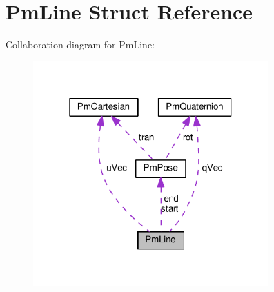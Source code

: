 \hypertarget{structPmLine}{}\section{Pm\+Line Struct Reference}
\label{structPmLine}


Collaboration diagram for Pm\+Line\+:
\nopagebreak
\begin{figure}[H]
\begin{center}
\leavevmode
\includegraphics[width=256pt]{structPmLine__coll__graph}
\end{center}
\end{figure}
